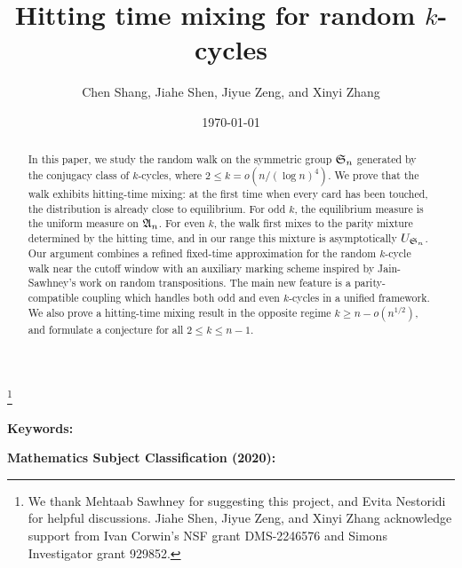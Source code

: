 \documentclass[11pt,twoside,reqno]{amsart}
\title{Hitting time mixing for random $k$-cycles}
\author{Chen Shang, Jiahe Shen, Jiyue Zeng, and Xinyi Zhang}
\date{\today}
\begin{document}
\thanks{We thank Mehtaab Sawhney for suggesting this project, and Evita Nestoridi for helpful discussions. Jiahe Shen, Jiyue Zeng, and Xinyi Zhang acknowledge support from Ivan Corwin’s NSF grant DMS-2246576 and Simons Investigator grant 929852.}

\maketitle

\begin{abstract}
In this paper, we study the random walk on the symmetric group $\S_n$ generated by the conjugacy class of $k$-cycles, where $2\le k=o(n/(\log n)^4)$. We prove that the walk exhibits hitting-time mixing: at the first time when every card has been touched, the distribution is already close to equilibrium. For odd \(k\), the equilibrium
measure is the uniform measure on \(\A_n\). For even \(k\), the walk first mixes to the parity mixture determined by the hitting time, and in our range this mixture is asymptotically \(U_{\S_n}\). Our argument combines a refined fixed-time approximation for the random $k$-cycle walk near the cutoff window with an auxiliary marking scheme inspired by Jain-Sawhney's work \cite{jain2024hitting} on random
transpositions. The main new feature is a parity-compatible coupling which handles both odd and even $k$-cycles in a unified framework. We also prove a hitting-time mixing result in the opposite regime $k\ge n-o(n^{1/2})$, and formulate a conjecture for all $2\le k\le n-1$.
\end{abstract}

\textbf{Keywords: }

\textbf{Mathematics Subject Classification (2020): }

\tableofcontents











%
\end{document}
